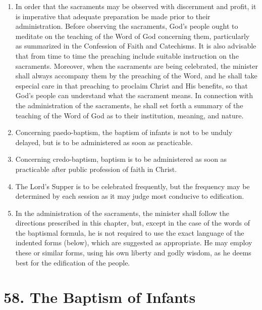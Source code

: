 \documentclass[
]{book}
\providecommand{\tightlist}{%
  \setlength{\itemsep}{0pt}\setlength{\parskip}{0pt}}
\begin{document}
\protect\hypertarget{chapter-slug-57-the-administration-of-the-sacraments-general-provisions}{\href{}{}}

\begin{enumerate}
\def\labelenumi{\arabic{enumi}.}
\tightlist
\item
  \protect\hypertarget{57}{\href{}{}}In order that the sacraments may be observed with discernment and profit, it is imperative that adequate preparation be made prior to their administration. Before observing the sacraments, God's people ought to meditate on the teaching of the Word of God concerning them, particularly as summarized in the Confession of Faith and Catechisms. It is also advisable that from time to time the preaching include suitable instruction on the sacraments. Moreover, when the sacraments are being celebrated, the minister shall always accompany them by the preaching of the Word, and he shall take especial care in that preaching to proclaim Christ and His benefits, so that God's people can understand what the sacrament means. In connection with the administration of the sacraments, he shall set forth a summary of the teaching of the Word of God as to their institution, meaning, and nature.
\item
  Concerning paedo-baptism, the baptism of infants is not to be unduly delayed, but is to be administered as soon as practicable.
\item
  Concerning credo-baptism, baptism is to be administered as soon as practicable after public profession of faith in Christ.
\item
  The Lord's Supper is to be celebrated frequently, but the frequency may be determined by each session as it may judge most conducive to edification.
\item
  In the administration of the sacraments, the minister shall follow the directions prescribed in this chapter, but, except in the case of the words of the baptismal formula, he is not required to use the exact language of the indented forms (below), which are suggested as appropriate. He may employ these or similar forms, using his own liberty and godly wisdom, as he deems best for the edification of the people.
\end{enumerate}

\hypertarget{the-baptism-of-infants}{%
\section*{58. The Baptism of Infants}\label{the-baptism-of-infants}}
\end{document}
